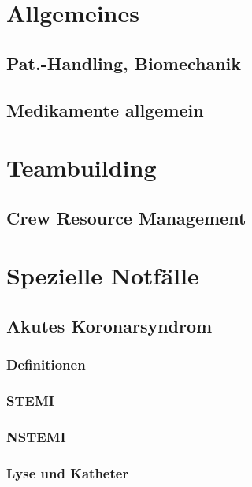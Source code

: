 \chapter{Allgemeines}

\clearpage
\section{Pat.-Handling, Biomechanik}

\clearpage
\section{Medikamente allgemein}


\chapter{Teambuilding}


\clearpage
\section{Crew Resource Management}

\chapter{Spezielle Notfälle}

\clearpage
\section{Akutes Koronarsyndrom}
\subsection{Definitionen}
\subsection{STEMI}
\subsection{NSTEMI}
\subsection{Lyse und Katheter}

